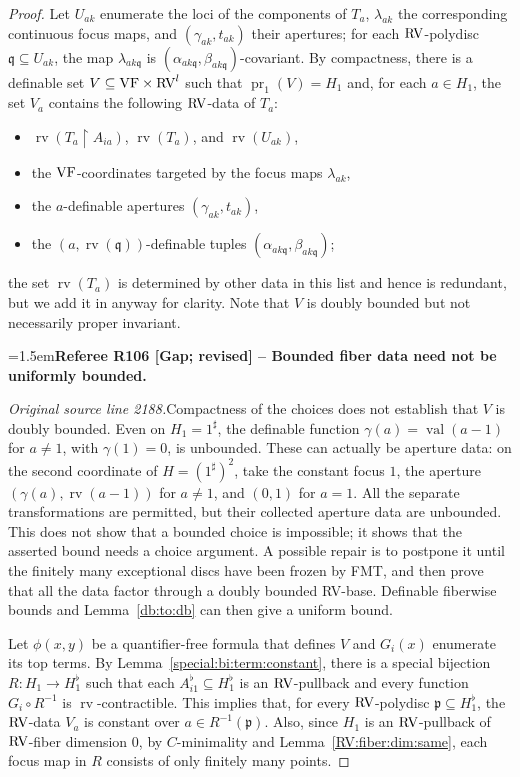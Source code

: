 \documentclass[12pt]{amsart}
\newcommand{\RefereeRemark}[4]{%
  \par\medskip\begingroup\normalfont\small\color{RefereePurple}%
  \emergencystretch=1.5em\noindent\textbf{Referee R#1 [#2] -- #3.}\par\nobreak\noindent #4\par
  \endgroup\medskip
}
\theoremstyle{plain}
\theoremstyle{definition}
\theoremstyle{remark}
\numberwithin{equation}{section}
\theoremstyle{plain}
\newcommand{\VF}{\textup{VF}}
\newcommand{\RV}{\textup{RV}}
\DeclareMathOperator{\pr}{pr}
\newcommand{\cmin}{$C$\nobreakdash}
\newcommand{\gp}{\mathfrak{p}}
\newcommand{\gq}{\mathfrak{q}}
\newcommand{\0}{\emptyset}
\newcommand{\rest}{\upharpoonright}
\newcommand{\fun}{\longrightarrow}
\newcommand{\sub}{\subseteq}
\DeclareMathOperator{\rv}{rv}
\DeclareMathOperator{\vv}{val}
\begin{document}
\begin{proof}
Let $U_{ak}$ enumerate the loci of the components of $T_{a}$, $\lambda_{ak}$ the corresponding continuous focus maps, and $(\gamma_{ak}, t_{ak})$ their apertures; for each $\RV$-polydisc $\gq \sub U_{ak}$, the map $\lambda_{ak\gq}$ is $(\alpha_{ak\gq}, \beta_{ak\gq})$-covariant. By compactness, there is a definable set $V \sub \VF \times \RV^l$ such that $\pr_1(V) = H_1$ and, for each $a \in H_1$, the set $V_a$ contains the following $\RV$-data of $T_a$:
\begin{itemize}
  \item $\rv(T_{a} \rest A_{ia})$, $\rv(T_{a})$, and $\rv(U_{ak})$,
  \item the $\VF$-coordinates targeted by the focus maps $\lambda_{ak}$,
  \item the $a$-definable apertures $(\gamma_{ak}, t_{ak})$,
   \item the $(a, \rv(\gq))$-definable tuples $(\alpha_{ak\gq}, \beta_{ak\gq})$;
\end{itemize}
the set  $\rv(T_{a})$ is determined by other data in this list and hence is redundant, but we add it in anyway for clarity. Note that $V$ is  doubly bounded but not necessarily proper invariant.

\RefereeRemark{106}{Gap; revised}{Bounded fiber data need not be uniformly bounded}{%
\textit{Original source line 2188.}\quad Compactness of the choices does not establish that $V$ is doubly bounded. Even on $H_1=1^\sharp$, the definable function $\gamma(a)=\vv(a-1)$ for $a\ne1$, with $\gamma(1)=0$, is unbounded. These can actually be aperture data: on the second coordinate of $H=(1^\sharp)^2$, take the constant focus $1$, the aperture $(\gamma(a),\rv(a-1))$ for $a\ne1$, and $(0,1)$ for $a=1$. All the separate transformations are permitted, but their collected aperture data are unbounded. This does not show that a bounded choice is impossible; it shows that the asserted bound needs a choice argument. A possible repair is to postpone it until the finitely many exceptional discs have been frozen by FMT, and then prove that all the data factor through a doubly bounded RV-base. Definable fiberwise bounds and Lemma~\ref{db:to:db} can then give a uniform bound.
}

Let $\phi(x, y)$ be a quantifier-free formula that defines $V$ and $G_{i}(x)$ enumerate its top terms. By Lemma~\ref{special:bi:term:constant}, there is a special bijection $R : H_1 \fun H_1^\flat$ such that each $A_{i1}^\flat \sub H_1^\flat$ is an $\RV$-pullback and every function $G_{i} \circ R^{-1}$ is $\rv$-contractible. This implies that,  for every $\RV$-polydisc $\gp \sub H_1^\flat$, the $\RV$-data $V_a$ is constant over $a \in R^{-1}(\gp)$. Also, since $H_1$ is an $\RV$-pullback of $\RV$-fiber dimension $0$, by \cmin-minimality and Lemma~\ref{RV:fiber:dim:same}, each focus map in $R$ consists of only finitely many points.


\end{proof}
\end{document}
